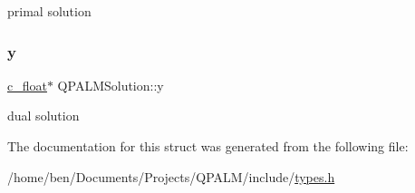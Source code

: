 primal solution 

\mbox{\label{structQPALMSolution_a4b4095c2519df9ab081df960dd9c0fea}} 
\subsubsection{\texorpdfstring{y}{y}}
{\footnotesize\ttfamily \mbox{\hyperlink{global__opts_8h_a7f1a9fda95e52979658c20a0d134fb15}{c\+\_\+float}}$\ast$ Q\+P\+A\+L\+M\+Solution\+::y}



dual solution 



The documentation for this struct was generated from the following file\+:\begin{DoxyCompactItemize}
\item 
/home/ben/\+Documents/\+Projects/\+Q\+P\+A\+L\+M/include/\mbox{\hyperlink{types_8h}{types.\+h}}\end{DoxyCompactItemize}

